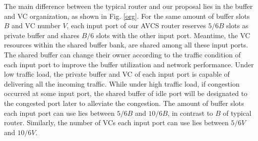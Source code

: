 \documentclass[10pt,conference]{IEEEtran}
\begin{document}
The main difference between the typical router and our proposal lies in the buffer and VC organization, as shown in Fig. \ref{org}. For the same amount of buffer slots $B$ and VC number $V$, each input port of our AVCS router reserves $5/6B$ slots as private buffer and shares $B/6$ slots with the other input port. Meantime, the VC resources within the shared buffer bank, are shared among all these input ports. The shared buffer can change their owner according to the traffic condition of each input port to improve the buffer utilization and network performance. Under low traffic load, the private buffer and VC of each input port is capable of delivering all the incoming traffic. While under high traffic load, if congestion occurred at some input port, the shared buffer of idle port will be designated to the congested port later to alleviate the congestion. The amount of buffer slots each input port can use lies between $5/6B$ and $10/6B$, in contrast to $B$ of typical router. Similarly, the number of VCs each input port can use lies between $5/6V$ and $10/6V$.

\end{document}
